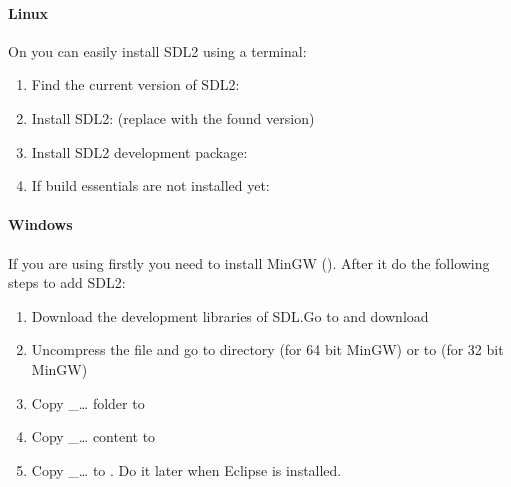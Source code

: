 \documentclass[letterpaper,10pt,english]{sphinxmanual}
\begin{document}
\paragraph{Linux}
\label{\detokenize{get-started/pc-simulator:linux}}
On  you can easily install SDL2 using a terminal:
\begin{enumerate}
\item {} 
Find the current version of SDL2: 

\item {} 
Install SDL2:  (replace with the found version)

\item {} 
Install SDL2 development package: 

\item {} 
If build essentials are not installed yet: 

\end{enumerate}


\paragraph{Windows}
\label{\detokenize{get-started/pc-simulator:windows}}
If you are using  firstly you need to install MinGW (). After it do the following steps to add SDL2:
\begin{enumerate}
\item {} 
Download the development libraries of SDL.Go to  and download 

\item {} 
Uncompress the file and go to  directory (for 64 bit MinGW) or to  (for 32 bit MinGW)

\item {} 
Copy \_… folder to 

\item {} 
Copy \_… content to 

\item {} 
Copy \_… to .  Do it later when Eclipse is installed.

\end{enumerate}
\end{document}
